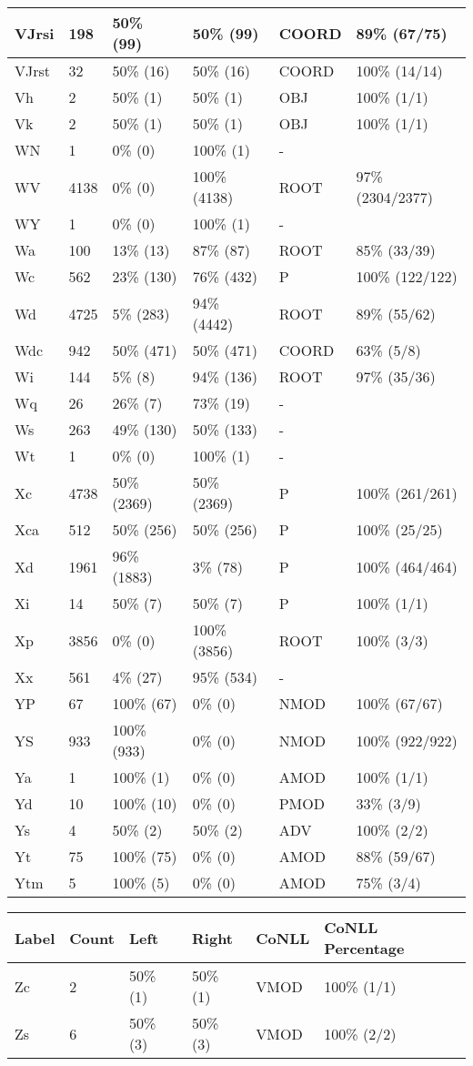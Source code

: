 \begin{figure*}
\begin{tabular}{|l|l|l|l||l|l|}
\hline
 VJrsi & 198 & 50\% (99) & 50\% (99) & COORD & 89\% (67/75) \\ 
\hline
 VJrst & 32 & 50\% (16) & 50\% (16) & COORD & 100\% (14/14) \\ 
\hline
 Vh & 2 & 50\% (1) & 50\% (1) & OBJ & 100\% (1/1) \\ 
\hline
 Vk & 2 & 50\% (1) & 50\% (1) & OBJ & 100\% (1/1) \\ 
\hline
 WN & 1 & 0\% (0) & 100\% (1) & - &  \\ 
\hline
 WV & 4138 & 0\% (0) & 100\% (4138) & ROOT & 97\% (2304/2377) \\ 
\hline
 WY & 1 & 0\% (0) & 100\% (1) & - &  \\ 
\hline
 Wa & 100 & 13\% (13) & 87\% (87) & ROOT & 85\% (33/39) \\ 
\hline
 Wc & 562 & 23\% (130) & 76\% (432) & P & 100\% (122/122) \\ 
\hline
 Wd & 4725 & 5\% (283) & 94\% (4442) & ROOT & 89\% (55/62) \\ 
\hline
 Wdc & 942 & 50\% (471) & 50\% (471) & COORD & 63\% (5/8) \\ 
\hline
 Wi & 144 & 5\% (8) & 94\% (136) & ROOT & 97\% (35/36) \\ 
\hline
 Wq & 26 & 26\% (7) & 73\% (19) & - &  \\ 
\hline
 Ws & 263 & 49\% (130) & 50\% (133) & - &  \\ 
\hline
 Wt & 1 & 0\% (0) & 100\% (1) & - &  \\ 
\hline
 Xc & 4738 & 50\% (2369) & 50\% (2369) & P & 100\% (261/261) \\ 
\hline
 Xca & 512 & 50\% (256) & 50\% (256) & P & 100\% (25/25) \\ 
\hline
 Xd & 1961 & 96\% (1883) & 3\% (78) & P & 100\% (464/464) \\ 
\hline
 Xi & 14 & 50\% (7) & 50\% (7) & P & 100\% (1/1) \\ 
\hline
 Xp & 3856 & 0\% (0) & 100\% (3856) & ROOT & 100\% (3/3) \\ 
\hline
 Xx & 561 & 4\% (27) & 95\% (534) & - &  \\ 
\hline
 YP & 67 & 100\% (67) & 0\% (0) & NMOD & 100\% (67/67) \\ 
\hline
 YS & 933 & 100\% (933) & 0\% (0) & NMOD & 100\% (922/922) \\ 
\hline
 Ya & 1 & 100\% (1) & 0\% (0) & AMOD & 100\% (1/1) \\ 
\hline
 Yd & 10 & 100\% (10) & 0\% (0) & PMOD & 33\% (3/9) \\ 
\hline
 Ys & 4 & 50\% (2) & 50\% (2) & ADV & 100\% (2/2) \\ 
\hline
 Yt & 75 & 100\% (75) & 0\% (0) & AMOD & 88\% (59/67) \\ 
\hline
 Ytm & 5 & 100\% (5) & 0\% (0) & AMOD & 75\% (3/4) \\ 
\hline
\end{tabular}
\end{figure*}
\begin{figure*}
\begin{tabular}{|l|l|l|l||l|l|}
\hline
Label & Count & Left & Right & CoNLL & CoNLL Percentage\\ 
\hline
 Zc & 2 & 50\% (1) & 50\% (1) & VMOD & 100\% (1/1) \\ 
\hline
 Zs & 6 & 50\% (3) & 50\% (3) & VMOD & 100\% (2/2) \\ 
\hline
\end{tabular}
\end{figure*}
